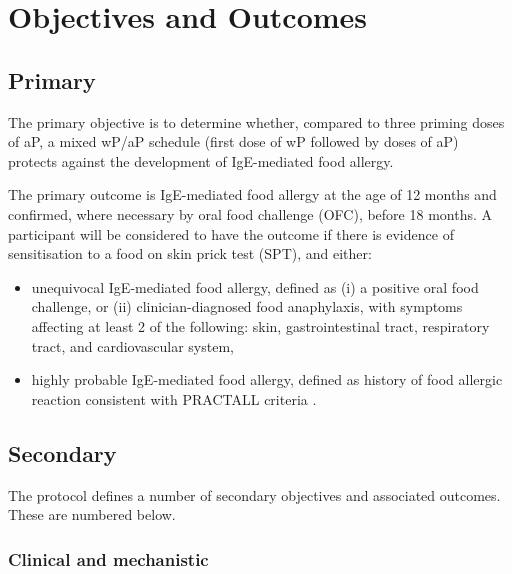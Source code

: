 \documentclass{bmcart}
\begin{document}
\section*{Objectives and Outcomes}

\subsection*{Primary}

The primary objective is to determine whether, compared to three priming doses of aP, a mixed wP/aP schedule (first dose of wP followed by doses of aP) protects against the development of IgE-mediated food allergy.

The primary outcome is IgE-mediated food allergy at the age of 12 months and confirmed, where necessary by oral food challenge (OFC), before 18 months.
A participant will be considered to have the outcome if there is evidence of sensitisation to a food on skin prick test (SPT), and either:
\begin{itemize}
	\item unequivocal IgE-mediated food allergy, defined as (i) a positive oral food challenge, or (ii) clinician-diagnosed food anaphylaxis, with symptoms affecting at least 2 of the following: skin, gastrointestinal tract, respiratory tract, and cardiovascular system,
	\item highly probable IgE-mediated food allergy, defined as history of food allergic reaction consistent with PRACTALL criteria \cite{sampson2012standardizing}.
\end{itemize}

\subsection*{Secondary}

The protocol defines a number of secondary objectives and associated outcomes.
These are numbered below.

\subsubsection*{Clinical and mechanistic}
\end{document}
